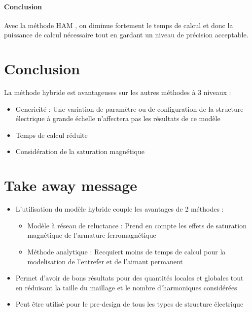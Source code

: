 \paragraph{Conclusion}
\bigbreak
Avec la méthode HAM , on diminue fortement le temps de calcul et donc la puissance de calcul nécessaire tout en gardant un niveau de précision acceptable.
\section{Conclusion}
La méthode hybride est avantageuses sur les autres méthodes à 3 niveaux : 
\begin{itemize}
    \item Genericité : Une variation de paramètre ou de configuration de la structure électrique à grande échelle n'affectera pas les résultats de ce modèle
    \item Temps de calcul réduite
    \item Considération de la saturation magnétique 
\end{itemize}
\section*{Take away message}  
\begin{itemize}
    \item L'utilisation du modèle hybride couple les avantages de 2 méthodes : \begin{itemize}
        \item Modèle à réseau de reluctance : Prend en compte les effets de saturation magnétique de l'armature ferromagnétique
        \item Méthode analytique : Recquiert moins de temps de calcul pour la modelisation de l'entrefer et de l'aimant permanent
    \end{itemize}
    \item Permet d'avoir de bons résultats pour des quantités locales et globales tout en réduisant la taille du maillage et le nombre d'harmoniques considérées
    \item Peut être utilisé pour le pre-design de tous les types de structure électrique
\end{itemize}
